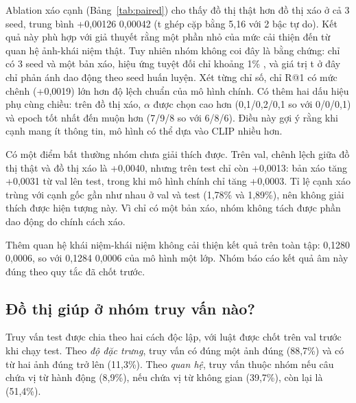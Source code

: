 Ablation xáo cạnh (Bảng~\ref{tab:paired}) cho thấy đồ thị thật hơn đồ thị xáo ở cả 3 seed, trung bình +0,00126 \pmm{} 0,00042 (t ghép cặp bằng 5,16 với 2 bậc tự do). Kết quả này phù hợp với giả thuyết rằng một phần nhỏ của mức cải thiện đến từ quan hệ ảnh-khái niệm thật. Tuy nhiên nhóm không coi đây là bằng chứng: chỉ có 3 seed và một bản xáo, hiệu ứng tuyệt đối chỉ khoảng 1\% \mrr, và giá trị t ở đây chỉ phản ánh dao động theo seed huấn luyện. Xét từng chỉ số, chỉ R@1 có mức chênh (+0,0019) lớn hơn độ lệch chuẩn của mô hình chính. Có thêm hai dấu hiệu phụ cùng chiều: trên đồ thị xáo, $\alpha$ được chọn cao hơn (0,1/0,2/0,1 so với 0/0/0,1) và epoch tốt nhất đến muộn hơn (7/9/8 so với 6/8/6). Điều này gợi ý rằng khi cạnh mang ít thông tin, mô hình có thể dựa vào CLIP nhiều hơn.

Có một điểm bất thường nhóm chưa giải thích được. Trên val, chênh lệch giữa đồ thị thật và đồ thị xáo là +0,0040, nhưng trên test chỉ còn +0,0013: bản xáo tăng +0,0031 từ val lên test, trong khi mô hình chính chỉ tăng +0,0003. Tỉ lệ cạnh xáo trùng với cạnh gốc gần như nhau ở val và test (1,78\% và 1,89\%), nên không giải thích được hiện tượng này. Vì chỉ có một bản xáo, nhóm không tách được phần dao động do chính cách xáo.

Thêm quan hệ khái niệm-khái niệm không cải thiện kết quả trên toàn tập: \mrr{} 0,1280 \pmm{} 0,0006, so với 0,1284 \pmm{} 0,0006 của mô hình một lớp. Nhóm báo cáo kết quả âm này đúng theo quy tắc đã chốt trước.

\subsection{Đồ thị giúp ở nhóm truy vấn nào?}
Truy vấn test được chia theo hai cách độc lập, với luật được chốt trên val trước khi chạy test. Theo \emph{độ đặc trưng}, truy vấn  có đúng một ảnh đúng (88,7\%) và  có từ hai ảnh đúng trở lên (11,3\%). Theo \emph{quan hệ}, truy vấn thuộc nhóm  nếu câu chứa vị từ hành động (8,9\%),  nếu chứa vị từ không gian (39,7\%), còn lại là  (51,4\%).

